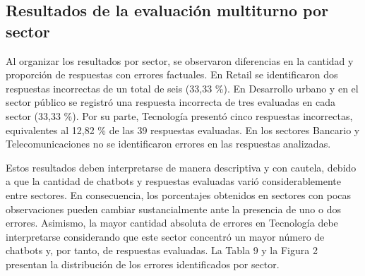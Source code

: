 \documentclass[manuscrito,spanish]{rcc}
\begin{document}
\subsection{Resultados de la evaluación multiturno por sector}
Al organizar los resultados por sector, se observaron diferencias en la cantidad y proporción de respuestas con errores factuales. En Retail se identificaron dos respuestas incorrectas de un total de seis (33,33 \%). En Desarrollo urbano y en el sector público se registró una respuesta incorrecta de tres evaluadas en cada sector (33,33 \%). Por su parte, Tecnología presentó cinco respuestas incorrectas, equivalentes al 12,82 \% de las 39 respuestas evaluadas. En los sectores Bancario y Telecomunicaciones no se identificaron errores en las respuestas analizadas.

Estos resultados deben interpretarse de manera descriptiva y con cautela, debido a que la cantidad de chatbots y respuestas evaluadas varió considerablemente entre sectores. En consecuencia, los porcentajes obtenidos en sectores con pocas observaciones pueden cambiar sustancialmente ante la presencia de uno o dos errores. Asimismo, la mayor cantidad absoluta de errores en Tecnología debe interpretarse considerando que este sector concentró un mayor número de chatbots y, por tanto, de respuestas evaluadas. La Tabla 9 y la Figura 2 presentan la distribución de los errores identificados por sector.
\end{document}
